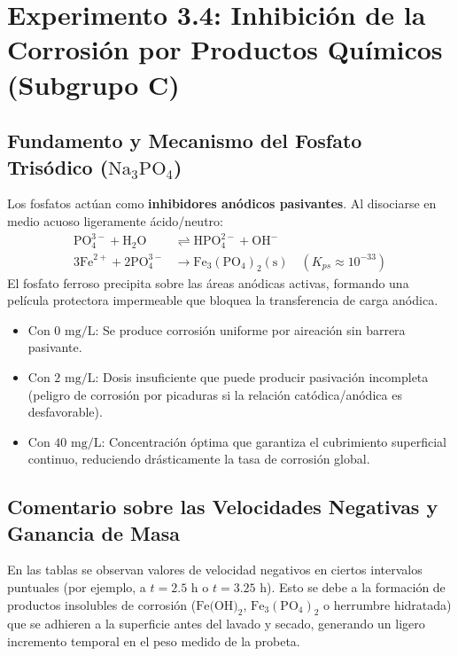 \documentclass[11pt,a4paper]{article}
\begin{document}
\section{Experimento 3.4: Inhibición de la Corrosión por Productos Químicos (Subgrupo C)}
\subsection{Fundamento y Mecanismo del Fosfato Trisódico ($\text{Na}_3\text{PO}_4$)}
Los fosfatos actúan como \textbf{inhibidores anódicos pasivantes}. Al disociarse en medio acuoso ligeramente ácido/neutro:
\begin{align}
    \text{PO}_4^{3-} + \text{H}_2\text{O} &\rightleftharpoons \text{HPO}_4^{2-} + \text{OH}^- \\
    3\text{Fe}^{2+} + 2\text{PO}_4^{3-} &\longrightarrow \text{Fe}_3(\text{PO}_4)_2(\text{s}) \quad (K_{ps} \approx 10^{-33})
\end{align}
El fosfato ferroso precipita sobre las áreas anódicas activas, formando una película protectora impermeable que bloquea la transferencia de carga anódica.
\begin{itemize}
    \item Con $0\text{ mg/L}$: Se produce corrosión uniforme por aireación sin barrera pasivante.
    \item Con $2\text{ mg/L}$: Dosis insuficiente que puede producir pasivación incompleta (peligro de corrosión por picaduras si la relación catódica/anódica es desfavorable).
    \item Con $40\text{ mg/L}$: Concentración óptima que garantiza el cubrimiento superficial continuo, reduciendo drásticamente la tasa de corrosión global.
\end{itemize}

\subsection{Comentario sobre las Velocidades Negativas y Ganancia de Masa}
En las tablas se observan valores de velocidad negativos en ciertos intervalos puntuales (por ejemplo, a $t = 2.5\text{ h}$ o $t = 3.25\text{ h}$). Esto se debe a la formación de productos insolubles de corrosión ($\text{Fe(OH)}_2$, $\text{Fe}_3(\text{PO}_4)_2$ o herrumbre hidratada) que se adhieren a la superficie antes del lavado y secado, generando un ligero incremento temporal en el peso medido de la probeta.
\end{document}
